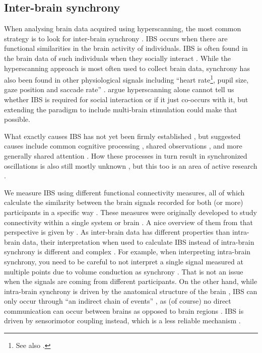 \subsection{Inter-brain synchrony}

When analysing brain data acquired using hyperscanning, the most common strategy
is to look for inter-brain synchrony
\parencite[IBS;][]{ayrolles_hypyp_2021}. IBS occurs when there are functional
similarities in the brain activity of individuals. IBS is often found in the
brain data of such individuals when they socially interact
\parencite{konvalinka_two-brain_2012}. While the hyperscanning approach is most
often used to collect brain data, synchrony has also been found in other
physiological signals including ``heart rate\footnote{See
also \textcite{mccraty_new_2017}.}, pupil size, gaze position and saccade rate''
\parencite{madsen_cognitive_2022}. \textcite{novembre_hyperscanning_2021} argue
hyperscanning alone cannot tell us whether IBS is required for social
interaction or if it just co-occurs with it, but extending the paradigm to
include multi-brain stimulation could make that possible.

What exactly causes IBS has not yet been firmly established
\parencite{liu_interactive_2018}, but suggested causes include common cognitive
processing \parencite{hamilton_hyperscanning_2021,madsen_cognitive_2022},
shared observations \parencite{hamilton_hyperscanning_2021}, and more generally
shared attention \parencite{dikker_brain--brain_2017,sebanz_joint_2006}. How
these processes in turn result in synchronized oscillations is also still mostly
unknown \parencite{liu_interactive_2018}, but this too is an area of active
research \parencite{hamilton_hyperscanning_2021,koike_hyperscanning_2015}.

We measure IBS using different functional connectivity measures, all of which
calculate the similarity between the brain signals recorded for both (or more)
participants in a specific way \parencite{czeszumski_hyperscanning_2020}. These
measures were originally developed to study connectivity within a single system
or brain \parencite{babiloni_social_2014}. A nice overview of them from that
perspective is given by \textcite[section~5]{cohen_analyzing_2014}. As
inter-brain data has different properties than intra-brain data, their
interpretation when used to calculate IBS instead of intra-brain synchrony is
different and complex \parencite{ayrolles_hypyp_2021}. For example, when
interpreting intra-brain synchrony, you need to be careful to not interpret a
single signal measured at multiple points due to volume conduction as synchrony
\parencite{czeszumski_hyperscanning_2020}. That is not an issue when the signals
are coming from different participants. On the other hand, while intra-brain
synchrony is driven by the anatomical structure of the brain
\parencite{ayrolles_hypyp_2021,dumas_anatomical_2012}, IBS can only occur
through ``an indirect chain of events'' \parencite{babiloni_social_2014}, as (of
course) no direct communication can occur between brains as opposed to brain
regions \parencite{babiloni_social_2014}. IBS is driven by sensorimotor coupling
instead, which is a less reliable mechanism \parencite{dumas_anatomical_2012}.

